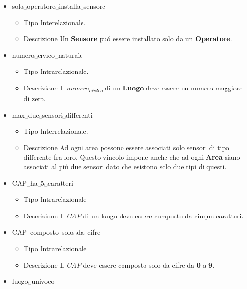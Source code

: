 \documentclass[11pt]{article}
\begin{document}
\begin{itemize}
\begin{itemize}
\end{itemize}
\item solo␣operatore␣installa␣sensore
\label{sec:org57a4b0d}
\begin{itemize}
\item Tipo
\label{sec:orgdc9bfe8}
Interelazionale.
\item Descrizione
\label{sec:orga7f514f}
Un \textbf{Sensore} puó essere installato solo da un \textbf{Operatore}.
\end{itemize}
\item numero␣civico␣naturale
\label{sec:org0057faa}
\begin{itemize}
\item Tipo
\label{sec:org506dcc4}
Intrarelazionale.
\item Descrizione
\label{sec:org408c769}
Il \emph{numero\textsubscript{civico}} di un \textbf{Luogo} deve essere un numero maggiore di zero.
\end{itemize}
\item max␣due␣sensori␣differenti
\label{sec:org3636905}
\begin{itemize}
\item Tipo
\label{sec:org44d1ac1}
Interrelazionale.
\item Descrizione
\label{sec:org825925c}
Ad ogni area possono essere associati solo sensori di tipo differente fra loro.
Questo vincolo impone anche che ad ogni \textbf{Area} siano associati al piú due sensori dato che esistono solo due tipi di questi.
\end{itemize}
\item CAP␣ha␣5␣caratteri
\label{sec:org03a427d}
\begin{itemize}
\item Tipo
\label{sec:org61af982}
Intrarelazionale
\item Descrizione
\label{sec:org44a59fe}
Il \emph{CAP} di un luogo deve essere composto da cinque caratteri.
\end{itemize}
\item CAP␣composto␣solo␣da␣cifre
\label{sec:org5e3dc73}
\begin{itemize}
\item Tipo
\label{sec:orgc49ae44}
Intrarelazionale
\item Descrizione
\label{sec:org0eb6b8a}
Il \emph{CAP} deve essere composto solo da cifre da \textbf{0} a \textbf{9}.
\end{itemize}
\item luogo␣univoco
\label{sec:org88ec514}
\begin{itemize}

\end{itemize}
\end{itemize}
\end{document}
